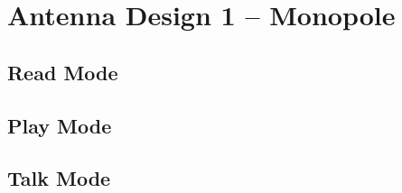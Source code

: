 \section{Antenna Design 1 -- Monopole}

\subsection{Read Mode}
\subsection{Play Mode}
\subsection{Talk Mode}


